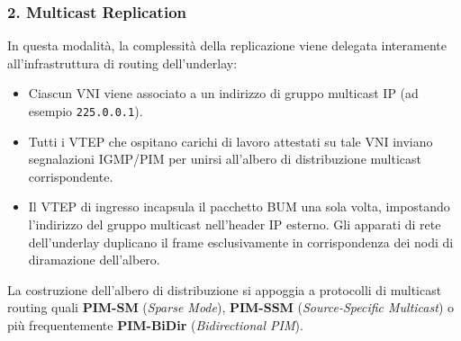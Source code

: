 \documentclass[11pt, a4paper]{article}
\begin{document}
\subsubsection{2. Multicast Replication}
In questa modalità, la complessità della replicazione viene delegata interamente all'infrastruttura di routing dell'underlay:
\begin{itemize}
    \item Ciascun VNI viene associato a un indirizzo di gruppo multicast IP (ad esempio \texttt{225.0.0.1}).
    \item Tutti i VTEP che ospitano carichi di lavoro attestati su tale VNI inviano segnalazioni IGMP/PIM per unirsi all'albero di distribuzione multicast corrispondente.
    \item Il VTEP di ingresso incapsula il pacchetto BUM una sola volta, impostando l'indirizzo del gruppo multicast nell'header IP esterno. Gli apparati di rete dell'underlay duplicano il frame esclusivamente in corrispondenza dei nodi di diramazione dell'albero.
\end{itemize}


La costruzione dell'albero di distribuzione si appoggia a protocolli di multicast routing quali \textbf{PIM-SM} (\emph{Sparse Mode}), \textbf{PIM-SSM} (\emph{Source-Specific Multicast}) o più frequentemente \textbf{PIM-BiDir} (\emph{Bidirectional PIM}).

\end{document}
